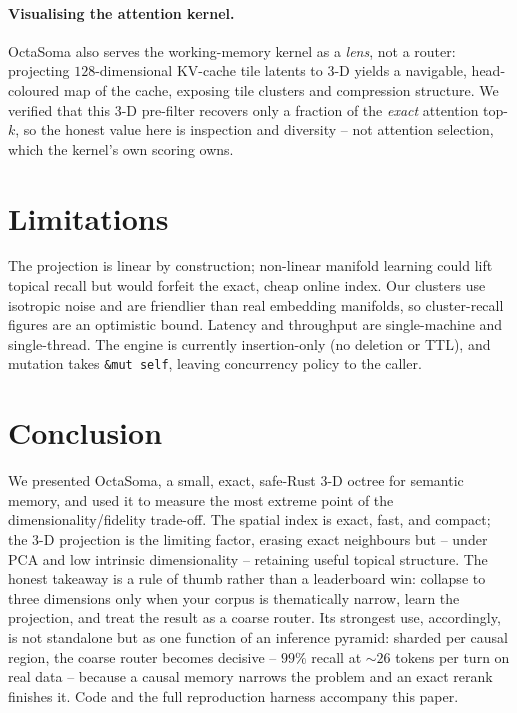 \documentclass[11pt]{article}
\begin{document}
\paragraph{Visualising the attention kernel.} OctaSoma also serves the
working-memory kernel as a \emph{lens}, not a router: projecting $128$-dimensional
KV-cache tile latents to 3-D yields a navigable, head-coloured map of the cache,
exposing tile clusters and compression structure. We verified that this 3-D
pre-filter recovers only a fraction of the \emph{exact} attention top-$k$, so the
honest value here is inspection and diversity -- not attention selection, which the
kernel's own scoring owns.

\section{Limitations}
The projection is linear by construction; non-linear manifold learning could lift
topical recall but would forfeit the exact, cheap online index. Our clusters use
isotropic noise and are friendlier than real embedding manifolds, so cluster-recall
figures are an optimistic bound. Latency and throughput are single-machine and
single-thread. The engine is currently insertion-only (no deletion or TTL), and
mutation takes \texttt{\&mut self}, leaving concurrency policy to the caller.

\section{Conclusion}
We presented OctaSoma, a small, exact, safe-Rust 3-D octree for semantic memory,
and used it to measure the most extreme point of the dimensionality/fidelity
trade-off. The spatial index is exact, fast, and compact; the 3-D projection is
the limiting factor, erasing exact neighbours but -- under PCA and low intrinsic
dimensionality -- retaining useful topical structure. The honest takeaway is a
rule of thumb rather than a leaderboard win: collapse to three dimensions only
when your corpus is thematically narrow, learn the projection, and treat the
result as a coarse router. Its strongest use, accordingly, is not standalone but as
one function of an inference pyramid: sharded per causal region, the coarse router
becomes decisive -- $99\%$ recall at ${\sim}26$ tokens per turn on real data --
because a causal memory narrows the problem and an exact rerank finishes it. Code
and the full reproduction harness accompany this paper.
\end{document}
